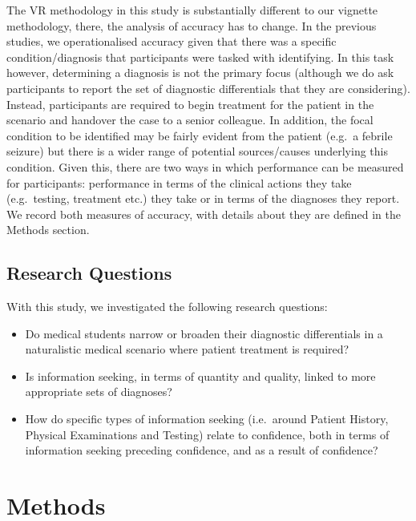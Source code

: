 \documentclass[a4paper, nobind]{templates/ociamthesis}
\providecommand{\tightlist}{%
  \setlength{\itemsep}{0pt}\setlength{\parskip}{0pt}}
\begin{document}
\hfill\break
The VR methodology in this study is substantially different to our vignette methodology, there, the analysis of accuracy has to change. In the previous studies, we operationalised accuracy given that there was a specific condition/diagnosis that participants were tasked with identifying. In this task however, determining a diagnosis is not the primary focus (although we do ask participants to report the set of diagnostic differentials that they are considering). Instead, participants are required to begin treatment for the patient in the scenario and handover the case to a senior colleague. In addition, the focal condition to be identified may be fairly evident from the patient (e.g.~a febrile seizure) but there is a wider range of potential sources/causes underlying this condition. Given this, there are two ways in which performance can be measured for participants: performance in terms of the clinical actions they take (e.g.~testing, treatment etc.) they take or in terms of the diagnoses they report. We record both measures of accuracy, with details about they are defined in the Methods section.

\subsection*{Research Questions}\label{research-questions-2}

With this study, we investigated the following research questions:

\begin{itemize}
\tightlist
\item
  Do medical students narrow or broaden their diagnostic differentials in a naturalistic medical scenario where patient treatment is required?
\item
  Is information seeking, in terms of quantity and quality, linked to more appropriate sets of diagnoses?
\item
  How do specific types of information seeking (i.e.~around Patient History, Physical Examinations and Testing) relate to confidence, both in terms of information seeking preceding confidence, and as a result of confidence?
\end{itemize}

\section*{Methods}\label{methods-3}
\end{document}
